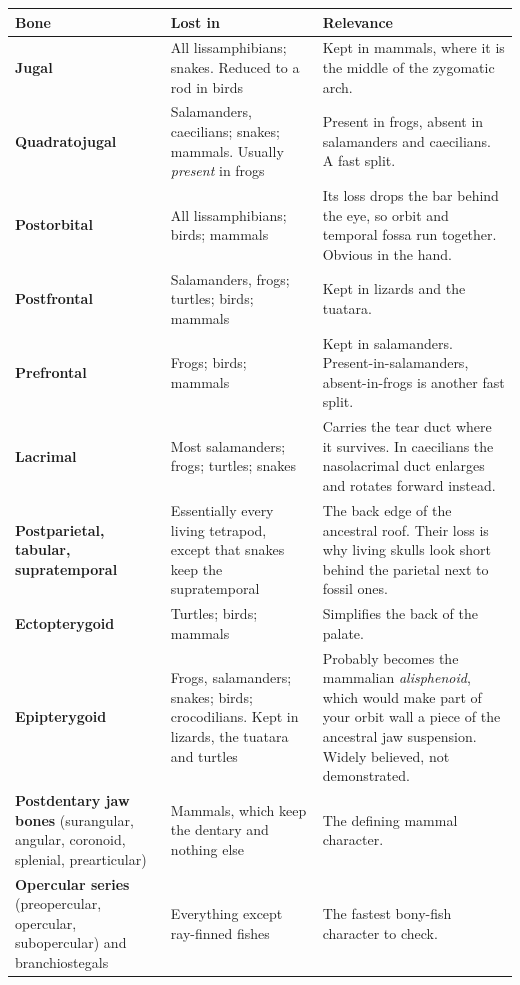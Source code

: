\documentclass[11pt]{article}
\newcommand{\bone}[1]{\textbf{#1}}
\newcommand{\term}[1]{\textsl{#1}}
\begin{document}
\begingroup\footnotesize
\begin{xltabular}{\linewidth}{L{2.9cm} L{4.0cm} X}
\toprule
\textbf{Bone} & \textbf{Lost in} & \textbf{Relevance} \\
\midrule
\endhead
\bone{Jugal} &
  All lissamphibians; snakes. Reduced to a rod in birds &
  Kept in mammals, where it is the middle of the zygomatic arch. \\
\bone{Quadratojugal} &
  Salamanders, caecilians; snakes; mammals. Usually \emph{present} in frogs &
  Present in frogs, absent in salamanders and caecilians. A fast split. \\
\bone{Postorbital} &
  All lissamphibians; birds; mammals &
  Its loss drops the bar behind the eye, so orbit and temporal fossa run
  together. Obvious in the hand. \\
\bone{Postfrontal} &
  Salamanders, frogs; turtles; birds; mammals &
  Kept in lizards and the tuatara. \\
\bone{Prefrontal} &
  Frogs; birds; mammals &
  Kept in salamanders. Present-in-salamanders, absent-in-frogs is another fast
  split. \\
\bone{Lacrimal} &
  Most salamanders; frogs; turtles; snakes &
  Carries the tear duct where it survives. In caecilians the nasolacrimal duct
  enlarges and rotates forward instead. \\
\bone{Postparietal, tabular, supratemporal} &
  Essentially every living tetrapod, except that snakes keep the supratemporal &
  The back edge of the ancestral roof. Their loss is why living skulls look
  short behind the parietal next to fossil ones. \\
\bone{Ectopterygoid} &
  Turtles; birds; mammals &
  Simplifies the back of the palate. \\
\bone{Epipterygoid} &
  Frogs, salamanders; snakes; birds; crocodilians. Kept in lizards, the tuatara
  and turtles &
  Probably becomes the mammalian \term{alisphenoid}, which would make part of
  your orbit wall a piece of the ancestral jaw suspension. Widely believed,
  not demonstrated. \\
\bone{Postdentary jaw bones} \newline (surangular, angular, coronoid, splenial,
  prearticular) &
  Mammals, which keep the dentary and nothing else &
  The defining mammal character. \\
\bone{Opercular series} \newline (preopercular, opercular, subopercular) and
  branchiostegals &
  Everything except ray-finned fishes &
  The fastest bony-fish character to check. \\
\bottomrule
\end{xltabular}\endgroup
\end{document}
